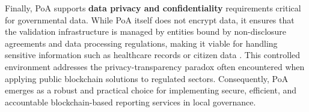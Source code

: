 Finally, PoA supports \textbf{data privacy and confidentiality} requirements critical for governmental data. While PoA itself does not encrypt data, it ensures that the validation infrastructure is managed by entities bound by non-disclosure agreements and data processing regulations, making it viable for handling sensitive information such as healthcare records or citizen data \cite{mdpi2023unleashing}. This controlled environment addresses the privacy-transparency paradox often encountered when applying public blockchain solutions to regulated sectors. Consequently, PoA emerges as a robust and practical choice for implementing secure, efficient, and accountable blockchain-based reporting services in local governance.
